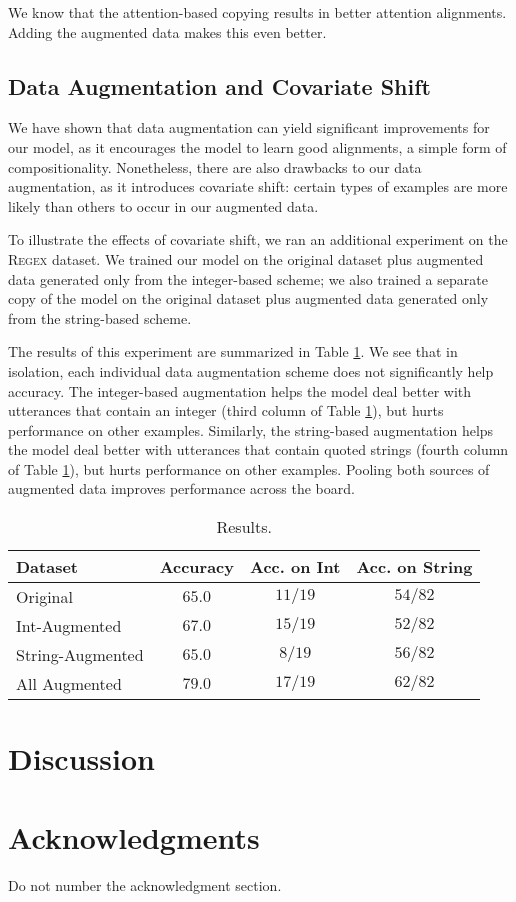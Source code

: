 \documentclass[11pt,letterpaper]{article}
\newcommand{\regex}{\textsc{Regex}\xspace}
\begin{document}
We know that the attention-based copying results in
better attention alignments.
Adding the augmented data makes this even better.

\subsection{Data Augmentation and Covariate Shift}
We have shown that data augmentation can yield significant improvements
for our model, as it encourages the model to learn good alignments,
a simple form of compositionality.  Nonetheless,
there are also drawbacks to our data augmentation, as it introduces
covariate shift: certain types of examples are more likely than others
to occur in our augmented data.

To illustrate the effects of covariate shift, we ran an additional
experiment on the \regex dataset.  We trained our model
on the original dataset plus augmented data generated only from the
integer-based scheme; we also trained a separate copy of the model
on the original dataset plus augmented data generated only from the
string-based scheme.  

The results of this experiment are summarized in Table \ref{tab:regex-shift}.
We see that in isolation, each individual data augmentation scheme
does not significantly help accuracy.
The integer-based augmentation helps the model deal better
with utterances that contain an integer 
(third column of Table \ref{tab:regex-shift}),
but hurts performance on other examples.
Similarly, the string-based augmentation helps the model
deal better with utterances that contain quoted strings 
(fourth column of Table \ref{tab:regex-shift}),
but hurts performance on other examples.
Pooling both sources of augmented data improves performance
across the board.

\begin{table}
  \centering
  \small
  \begin{tabular}{|l|c|c|c|}
    \hline
    Dataset & Accuracy & Acc. on Int & Acc. on String \\
    \hline
    Original & $65.0$ & $11/19$ & $54/82$ \\
    Int-Augmented & $67.0$ & $15/19$ & $52/82$ \\
    String-Augmented & $65.0$ & $8/19$ & $56/82$\\
    All Augmented & $79.0$ & $17/19$ & $62/82$ \\
    \hline
  \end{tabular}
  \caption{Results.}
  \label{tab:regex-shift}
\end{table}

\section{Discussion}

\section*{Acknowledgments}

Do not number the acknowledgment section.



\end{document}
